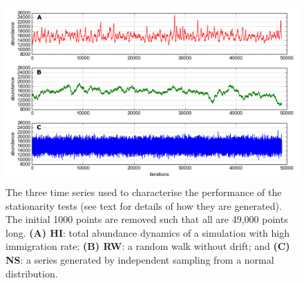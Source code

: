   
\begin{figure}[ht]
	\centering
	\includegraphics[width=0.8\linewidth]{"./chapters/chapter04b/figures/hi_rw_ns_dynamics"}
     \caption{The three time series used to characterise the performance of the stationarity tests (see text for details of how they are generated). The initial 1000 points are removed such that all are 49,000 points long. \textbf{(A) HI}: total abundance dynamics of a simulation with high immigration rate; \textbf{(B) RW}: a random walk without drift; and \textbf{(C) NS}: a series generated by independent sampling from a normal distribution.} 
     \label{fig:adf}   
\end{figure}


